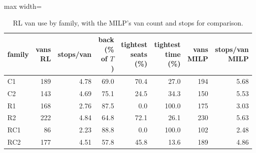\begin{table}[H]\centering
\small
\caption{RL van use by family, with the MILP's van count and stops for comparison.}\label{tab:vansfamily}
\begin{adjustbox}{max width=\textwidth}\begin{tabular}{lrrrrrrr}\toprule
family & vans RL & stops/van & back (\% of $T$) & tightest seats (\%) & tightest time (\%) & vans MILP & stops/van MILP \\ \midrule
C1 & 189 & 4.78 & 69.0 & 70.4 & 27.0 & 194 & 5.68 \\
C2 & 143 & 4.69 & 75.1 & 24.5 & 34.3 & 150 & 5.53 \\
R1 & 168 & 2.76 & 87.5 & 0.0 & 100.0 & 175 & 3.03 \\
R2 & 222 & 4.84 & 64.8 & 72.1 & 26.1 & 230 & 5.63 \\
RC1 & 86 & 2.23 & 88.8 & 0.0 & 100.0 & 102 & 2.48 \\
RC2 & 177 & 4.51 & 57.8 & 45.8 & 13.6 & 189 & 4.86 \\
\bottomrule\end{tabular}\end{adjustbox}\end{table}
